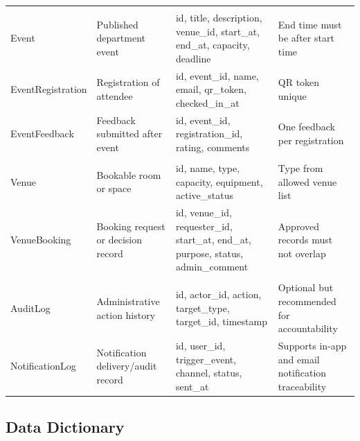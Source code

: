 \documentclass[12pt,a4paper]{article}
\begin{document}
\begin{longtable}{@{}L{3.6cm}L{3.2cm}L{3.5cm}L{3.5cm}@{}}
\\
Event & Published department event & id, title, description, venue\_id, start\_at, end\_at, capacity, deadline & End time must be after start time \\
Event\-\newline Registration & Registration of attendee & id, event\_id, name, email, qr\_token, checked\_in\_at & QR token unique \\
EventFeedback & Feedback submitted after event & id, event\_id, registration\_id, rating, comments & One feedback per registration \\

\\
Venue & Bookable room or space & id, name, type, capacity, equipment, active\_status & Type from allowed venue list \\
VenueBooking & Booking request or decision record & id, venue\_id, requester\_id, start\_at, end\_at, purpose, status, admin\_comment & Approved records must not overlap \\

\\
AuditLog & Administrative action history & id, actor\_id, action, target\_type, target\_id, timestamp & Optional but recommended for accountability \\
NotificationLog & Notification delivery/audit record & id, user\_id, trigger\_event, channel, status, sent\_at & Supports in-app and email notification traceability \\
\bottomrule
\end{longtable}

\subsection{Data Dictionary}
\end{document}
